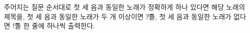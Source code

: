 주어지는 질문 순서대로 첫 세 음과 동일한 노래가 정확하게 하나 있다면 해당 노래의 제목을, 첫 세 음과 동일한 노래가 두 개 이상이면 \t{?}을, 첫 세 음과 동일한 노래가 없다면 \t{!}을 한 줄에 하나씩 출력한다.
